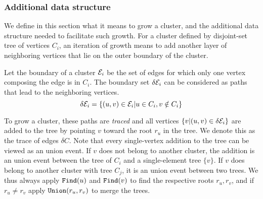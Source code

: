 \subsubsection{Additional data structure}
We define in this section what it means to grow a cluster, and the additional data structure needed to facilitate such growth. For a cluster defined by disjoint-set tree of vertices $C_i$, an iteration of growth means to add another layer of neighboring vertices that lie on the outer boundary of the cluster. 
\begin{definition}\label{def:clusterboud}
  Let the boundary of a cluster $\mathcal{E}_i$ be the set of edges for which only one vertex composing the edge is in $C_i$. The boundary set $\delta \mathcal{E}_i$ can be considered as paths that lead to the neighboring vertices. 
  \begin{equation}
    \delta \mathcal{E}_i = \{(u,v)\in \mathcal{E}_i | u \in C_i, v \notin C_i\}
  \end{equation}
\end{definition}
To grow a cluster, these paths are \emph{traced} and all vertices $\{v | (u,v) \in \delta \mathcal{E}_i\}$ are added to the tree by pointing $v$ toward the root $r_u$ in the tree. We denote this as the trace of edges $\delta C$. Note that every single-vertex addition to the tree can be viewed as an union event. If $v$ does not belong to another cluster, the addition is an union event between the tree of $C_i$ and a single-element tree $\{v\}$. If $v$ does belong to another cluster with tree $C_j$, it is an union event between two trees. We thus always apply $\texttt{Find}(u)$ and $\texttt{Find}(v)$ to find the respective roots $r_u, r_v$, and if $r_u\neq r_v$ apply $\texttt{Union}(r_u, r_v)$ to merge the trees.


